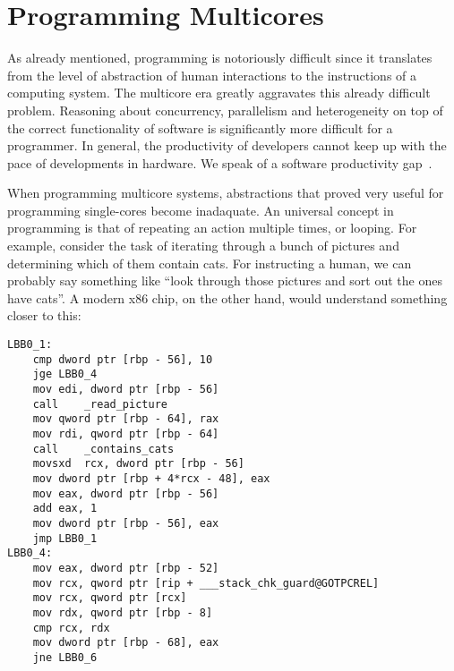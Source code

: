 \section{Programming Multicores}

As already mentioned, programming is notoriously difficult since it translates from the level of abstraction of human interactions to the instructions of a computing system.
The multicore era greatly aggravates this already difficult problem.
Reasoning about concurrency, parallelism and heterogeneity on top of the correct functionality of software is significantly more difficult for a programmer.
In general, the productivity of developers cannot keep up with the pace of developments in hardware.
We speak of a software productivity gap~\cite{castrillon2014thesis,ecker2009hardware}. 

When programming multicore systems, abstractions that proved very useful for programming single-cores become inadaquate.
An universal concept in programming is that of repeating an action multiple times, or looping. 
For example, consider the task of iterating through a bunch of pictures and determining which of them contain cats.
For instructing a human, we can probably say something like ``look through those pictures and sort out the ones have cats''.
A modern x86 chip, on the other hand, would understand something closer to this:

\begin{verbatim}
LBB0_1:                                 
	cmp	dword ptr [rbp - 56], 10
	jge	LBB0_4
	mov	edi, dword ptr [rbp - 56]
	call	_read_picture
	mov	qword ptr [rbp - 64], rax
	mov	rdi, qword ptr [rbp - 64]
	call	_contains_cats
	movsxd	rcx, dword ptr [rbp - 56]
	mov	dword ptr [rbp + 4*rcx - 48], eax
	mov	eax, dword ptr [rbp - 56]
	add	eax, 1
	mov	dword ptr [rbp - 56], eax
	jmp	LBB0_1
LBB0_4:
	mov	eax, dword ptr [rbp - 52]
	mov	rcx, qword ptr [rip + ___stack_chk_guard@GOTPCREL]
	mov	rcx, qword ptr [rcx]
	mov	rdx, qword ptr [rbp - 8]
	cmp	rcx, rdx
	mov	dword ptr [rbp - 68], eax 
	jne	LBB0_6
\end{verbatim}

